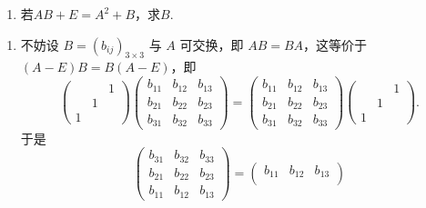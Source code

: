 \begin{exercise}
\begin{exgroup}
\begin{enumerate}
            \item 若$AB+E=A^2+B$，求$B$.
        \end{enumerate}
        \begin{answer}
            \begin{enumerate}
                \item 不妨设 $ B = (b_{ij})_{3 \times 3} $ 与 $ A $ 可交换，即 $ AB = BA $，这等价于 $ (A - E)B = B(A - E) $，即
                      \[ \begin{pmatrix}
                                &   & 1 \\
                                & 1 &   \\
                              1 &   &
                          \end{pmatrix}
                          \begin{pmatrix}
                              b_{11} & b_{12} & b_{13} \\
                              b_{21} & b_{22} & b_{23} \\
                              b_{31} & b_{32} & b_{33}
                          \end{pmatrix} =
                          \begin{pmatrix}
                              b_{11} & b_{12} & b_{13} \\
                              b_{21} & b_{22} & b_{23} \\
                              b_{31} & b_{32} & b_{33}
                          \end{pmatrix}
                          \begin{pmatrix}
                                &   & 1 \\
                                & 1 &   \\
                              1 &   &
                          \end{pmatrix}. \]
                      于是
                      \[ \begin{pmatrix}
                              b_{31} & b_{32} & b_{33} \\
                              b_{21} & b_{22} & b_{23} \\
                              b_{11} & b_{12} & b_{13}
                          \end{pmatrix} = \begin{pmatrix}
                              b_{11} & b_{12} & b_{13} \\

\end{pmatrix}\]
\end{enumerate}
\end{answer}
\end{exgroup}
\end{exercise}
